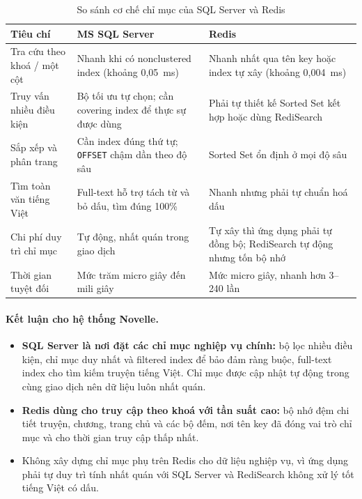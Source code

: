 \begin{table}[H]
\centering\small
\renewcommand{\arraystretch}{1.25}
\begin{tabularx}{\textwidth}{|>{\raggedright\arraybackslash}p{3.2cm}|>{\raggedright\arraybackslash}X|>{\raggedright\arraybackslash}X|}
\hline
\textbf{Tiêu chí} & \textbf{MS SQL Server} & \textbf{Redis} \\ \hline
Tra cứu theo khoá / một cột & Nhanh khi có nonclustered index (khoảng 0,05~ms) & Nhanh nhất qua tên key hoặc index tự xây (khoảng 0,004~ms) \\ \hline
Truy vấn nhiều điều kiện & Bộ tối ưu tự chọn; cần covering index để thực sự được dùng & Phải tự thiết kế Sorted Set kết hợp hoặc dùng RediSearch \\ \hline
Sắp xếp và phân trang & Cần index đúng thứ tự; \texttt{OFFSET} chậm dần theo độ sâu & Sorted Set ổn định ở mọi độ sâu \\ \hline
Tìm toàn văn tiếng Việt & Full-text hỗ trợ tách từ và bỏ dấu, tìm đúng 100\% & Nhanh nhưng phải tự chuẩn hoá dấu \\ \hline
Chi phí duy trì chỉ mục & Tự động, nhất quán trong giao dịch & Tự xây thì ứng dụng phải tự đồng bộ; RediSearch tự động nhưng tốn bộ nhớ \\ \hline
Thời gian tuyệt đối & Mức trăm micro giây đến mili giây & Mức micro giây, nhanh hơn 3--240 lần \\ \hline
\end{tabularx}
\caption{So sánh cơ chế chỉ mục của SQL Server và Redis}
\label{tab:idx-compare}
\end{table}

\paragraph{Kết luận cho hệ thống Novelle.}
\begin{itemize}
    \item \textbf{SQL Server là nơi đặt các chỉ mục nghiệp vụ chính:} bộ lọc nhiều điều kiện, chỉ mục duy nhất và filtered index để bảo đảm ràng buộc, full-text index cho tìm kiếm truyện tiếng Việt. Chỉ mục được cập nhật tự động trong cùng giao dịch nên dữ liệu luôn nhất quán.
    \item \textbf{Redis dùng cho truy cập theo khoá với tần suất cao:} bộ nhớ đệm chi tiết truyện, chương, trang chủ và các bộ đếm, nơi tên key đã đóng vai trò chỉ mục và cho thời gian truy cập thấp nhất.
    \item Không xây dựng chỉ mục phụ trên Redis cho dữ liệu nghiệp vụ, vì ứng dụng phải tự duy trì tính nhất quán với SQL Server và RediSearch không xử lý tốt tiếng Việt có dấu.
\end{itemize}
